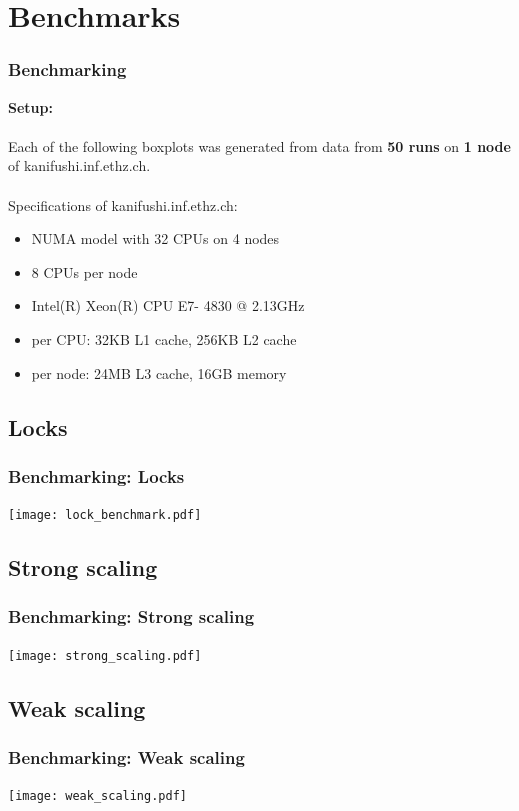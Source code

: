 \documentclass{beamer}
\begin{document}
\section{Benchmarks}

\begin{frame}
\frametitle{Benchmarking}
\textbf{Setup:}\\ \quad\\
Each of the following boxplots was generated from data from \textbf{50 runs} on \textbf{1 node} of kanifushi.inf.ethz.ch.\\
\quad\\
Specifications of kanifushi.inf.ethz.ch:
\begin{itemize}
\item NUMA model with 32 CPUs on 4 nodes
\item 8 CPUs per node
\item Intel(R) Xeon(R) CPU E7- 4830  @ 2.13GHz
\item per CPU: 32KB L1 cache, 256KB L2 cache
\item per node: 24MB L3 cache, 16GB memory
\end{itemize}

\end{frame}

\subsection{Locks}
\begin{frame}
\frametitle{Benchmarking: Locks}
\begin{center}
	\texttt{[image: lock\_benchmark.pdf]}
\end{center}
\end{frame}

\subsection{Strong scaling}
\begin{frame}
\frametitle{Benchmarking: Strong scaling}
\begin{center}
	\texttt{[image: strong\_scaling.pdf]}
\end{center}
\end{frame}

\subsection{Weak scaling}
\begin{frame}
\frametitle{Benchmarking: Weak scaling}
\begin{center}
	\texttt{[image: weak\_scaling.pdf]}
\end{center}
\end{frame}
\end{document}
